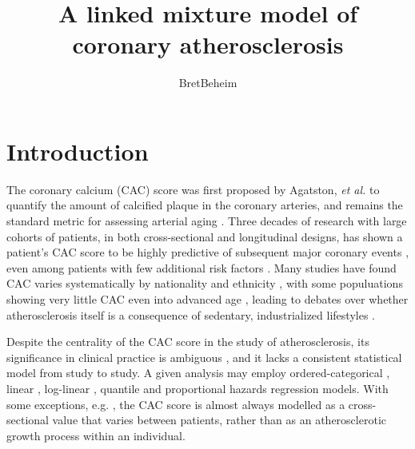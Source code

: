 \documentclass[aps,pre,twocolumn,twoside,tightenlines,groupedaddress,amsmath,amssymb,nobibnotes,final,showkeys,letterpaper]{revtex4-2}
\begin{document}
\title{A linked mixture model of coronary atherosclerosis}
\author{Bret\;Beheim}


\maketitle

\section{Introduction}

The coronary calcium (CAC) score was first proposed by Agatston, \textit{et al.} \cite{agatston1990cac} to quantify the amount of calcified plaque in the coronary arteries, and remains the standard metric for assessing arterial aging \cite{berry2012lifetime, nakahara2017calcification}. Three decades of research with large cohorts of patients, in both cross-sectional and longitudinal designs, has shown a patient's CAC score to be highly predictive of subsequent major coronary events \cite{vliegenthart2002rotterdam, kondos2003events, arad2005events, lamonte2005dallas, budoff2007long}, even among patients with few additional risk factors \cite{taylor2005premature, lakoski2007lowriskwomen}. Many studies have found CAC varies systematically by nationality \cite{santos2006international, schmermund2007comparison} and ethnicity \cite{hoff2001trajectories, bild2002mesa, bild2005ethnic, budoff2006ethnic}, with some populuations showing very little CAC even into advanced age \cite{kaplan2017tsimane}, leading to debates over whether atherosclerosis itself is a consequence of sedentary, industrialized lifestyles \cite{thompson2013mummies, gurven2020weird}.

Despite the centrality of the CAC score in the study of atherosclerosis, its significance in clinical practice is ambiguous \cite{berman2016beyond, blaha2016improving}, and it lacks a consistent statistical model from study to study. A given analysis may employ ordered-categorical \cite{budoff2007long, koulaouzidis2013aggressive, silverman2014extreme, fujiyoshi2014japan}, linear \cite{koulaouzidis2013comparison, budoff2013progression}, log-linear \cite{criqui2014density, mcclelland2015prediction, blaha2016improving, hughesaustin2016relationship}, quantile \cite{ahmed2013mesa, ohmotosekine2016lung} and proportional hazards \cite{nasir2007mortality, folsom2008imt, hou2012prognostic} regression models. With some exceptions, e.g. \cite{mcclelland2009arterial, defilippis2011framingham, budoff2013progression, ahmed2013mesa, arguelles2014factors, whelton2015predictors}, the CAC score is almost always modelled as a cross-sectional value that varies between patients, rather than as an atherosclerotic growth process within an individual.
\end{document}
